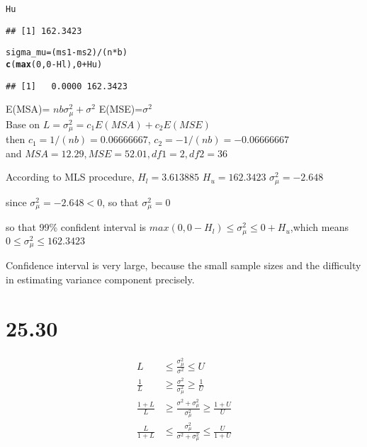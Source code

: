 \documentclass{article}\usepackage[]{graphicx}\usepackage[]{color}
\makeatletter
\newcommand{\hlnum}[1]{\textcolor[rgb]{0.686,0.059,0.569}{#1}}%
\newcommand{\hlopt}[1]{\textcolor[rgb]{0,0,0}{#1}}%
\newcommand{\hlstd}[1]{\textcolor[rgb]{0.345,0.345,0.345}{#1}}%
\newcommand{\hlkwb}[1]{\textcolor[rgb]{0.69,0.353,0.396}{#1}}%
\newcommand{\hlkwd}[1]{\textcolor[rgb]{0.737,0.353,0.396}{\textbf{#1}}}%
\newenvironment{kframe}{%
 \def\at@end@of@kframe{}%
 \ifinner\ifhmode%
  \def\at@end@of@kframe{\end{minipage}}%
  \begin{minipage}{\columnwidth}%
 \fi\fi%
 \def\FrameCommand##1{\hskip\@totalleftmargin \hskip-\fboxsep
 \colorbox{shadecolor}{##1}\hskip-\fboxsep
     \hskip-\linewidth \hskip-\@totalleftmargin \hskip\columnwidth}%
 \MakeFramed {\advance\hsize-\width
   \@totalleftmargin\z@ \linewidth\hsize
   \@setminipage}}%
 {\par\unskip\endMakeFramed%
 \at@end@of@kframe}
\newenvironment{knitrout}{}{} %
\makeatother
\begin{document}
\begin{enumerate}[(a)]
\begin{knitrout}
\begin{kframe}
\begin{alltt}
  \hlstd{Hu}
\end{alltt}
\begin{verbatim}
## [1] 162.3423
\end{verbatim}
\begin{alltt}
  \hlstd{sigma_mu} \hlkwb{=}  \hlstd{(ms1}\hlopt{-}\hlstd{ms2)}\hlopt{/}\hlstd{(n}\hlopt{*}\hlstd{b)}
  \hlkwd{c}\hlstd{(}\hlkwd{max}\hlstd{(}\hlnum{0}\hlstd{,}\hlnum{0}\hlopt{-}\hlstd{Hl),} \hlnum{0}\hlopt{+}\hlstd{Hu)}
\end{alltt}
\begin{verbatim}
## [1]   0.0000 162.3423
\end{verbatim}
\end{kframe}
\end{knitrout}

\begin{center}
E(MSA)= $nb\sigma_\mu^2+\sigma^2$ \qquad E(MSE)=$\sigma^2$\\
Base on $L=\sigma_\mu^2=c_1E(MSA)+c_2E(MSE)$\\
then $c_1=1/(nb)=0.06666667$, $c_2=-1/(nb)=-0.06666667$\\
and $MSA=12.29, MSE=52.01, df1=2, df2=36$\\
\end{center}

According to MLS procedure, $H_l=3.613885$ \qquad $H_u=162.3423$ \qquad $\sigma_\mu^2=-2.648$

since $\sigma_\mu^2=-2.648<0$, so that $\sigma_\mu^2=0$

\qquad so that 99\% confident interval is  $max(0,0-H_l) \leq \sigma_\mu^2 \leq 0+H_u$,which means $0 \leq \sigma_\mu^2 \leq 162.3423$

Confidence interval is very large, because the small sample sizes and the difficulty in estimating variance component precisely.

\end{enumerate}

\section {25.30}

\begin{displaymath}
\begin{split}
L &\leq \frac{\sigma_\mu^2}{\sigma^2} \leq U\\
\frac{1}{L} &\geq \frac{\sigma^2}{\sigma_\mu^2} \geq \frac{1}{U}\\
\frac{1+L}{L} &\geq \frac{\sigma^2+\sigma_\mu^2}{\sigma_\mu^2} \geq \frac{1+U}{U}\\
\frac{L}{1+L} &\leq \frac{\sigma_\mu^2}{\sigma^2+\sigma_\mu^2} \leq \frac{U}{1+U}\\
\end{split}
\end{displaymath}
\end{document}

